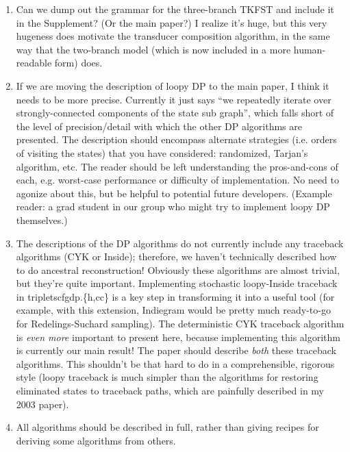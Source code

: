 {\begin{enumerate}
and should then be prepared for the idea that the ``composition algorithm'' is simply generating this table
(or other tables for other phylogenies).
The latex for this is in the file ``tkfst.tex'', and is currently include'd at the start of the supplementary information (it should go in the main paper though, I think).
%
\item Can we dump out the grammar for the three-branch TKFST and include it in the Supplement?
(Or the main paper?) I realize it's huge, but this very hugeness does motivate the transducer composition algorithm,
in the same way that the two-branch model (which is now included in a more human-readable form) does.
%
\item If we are moving the description of loopy DP to the main paper, I think it needs to be more precise.
Currently it just says ``we repeatedly iterate over strongly-connected components of the state sub graph'',
which falls short of the level of precision/detail with which the other DP algorithms are presented.
The description should encompass alternate strategies (i.e. orders of visiting the states) that you have considered:
randomized, Tarjan's algorithm, etc.
The reader should be left understanding the pros-and-cons of each,
 e.g. worst-case performance or difficulty of implementation.
No need to agonize about this, but be helpful to potential future developers.
  (Example reader: a grad student in our group who might try to implement loopy DP themselves.)
%
\item The descriptions of the DP algorithms do not currently include any traceback algorithms (CYK or Inside);
therefore, we haven't technically described how to do ancestral reconstruction!
Obviously these algorithms are almost trivial, but they're quite important.
Implementing stochastic loopy-Inside traceback in tripletscfgdp.\{h,cc\} is a key step in transforming it into a useful tool
(for example, with this extension, Indiegram would be pretty much ready-to-go for Redelings-Suchard sampling).
The deterministic CYK traceback algorithm is {\em even more} important to present here, because implementing this algorithm is currently our main result!
The paper should describe {\em both} these traceback algorithms.
This shouldn't be that hard to do in a comprehensible, rigorous style
 (loopy traceback is much simpler than the algorithms for restoring eliminated states to traceback paths, which are painfully described in my 2003 paper).
%
\item All algorithms should be described in full, rather than giving recipes for deriving some algorithms from others.

\end{enumerate}}
